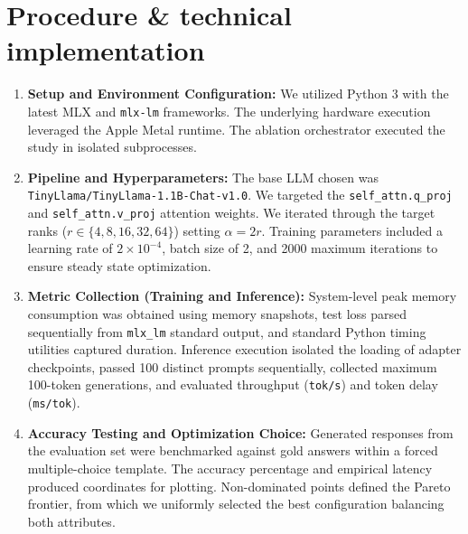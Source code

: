 \documentclass[10pt,a4paper]{article}
\begin{document}
\section*{Procedure \& technical implementation}
\begin{enumerate}
  \item \textbf{Setup and Environment Configuration:} 
  We utilized Python 3 with the latest MLX and \texttt{mlx-lm} frameworks. The underlying hardware execution leveraged the Apple Metal runtime. The ablation orchestrator executed the study in isolated subprocesses.
  
  \item \textbf{Pipeline and Hyperparameters:} 
  The base LLM chosen was \texttt{TinyLlama/TinyLlama-1.1B-Chat-v1.0}. We targeted the \texttt{self\_attn.q\_proj} and \texttt{self\_attn.v\_proj} attention weights. We iterated through the target ranks ($r \in \{4, 8, 16, 32, 64\}$) setting $\alpha = 2r$. Training parameters included a learning rate of $2\times10^{-4}$, batch size of 2, and 2000 maximum iterations to ensure steady state optimization.

  \item \textbf{Metric Collection (Training and Inference):} 
  System-level peak memory consumption was obtained using memory snapshots, test loss parsed sequentially from \texttt{mlx\_lm} standard output, and standard Python timing utilities captured duration. Inference execution isolated the loading of adapter checkpoints, passed 100 distinct prompts sequentially, collected maximum 100-token generations, and evaluated throughput (\texttt{tok/s}) and token delay (\texttt{ms/tok}).

  \item \textbf{Accuracy Testing and Optimization Choice:} 
  Generated responses from the evaluation set were benchmarked against gold answers within a forced multiple-choice template. The accuracy percentage and empirical latency produced coordinates for plotting. Non-dominated points defined the Pareto frontier, from which we uniformly selected the best configuration balancing both attributes.
\end{enumerate}
\end{document}
